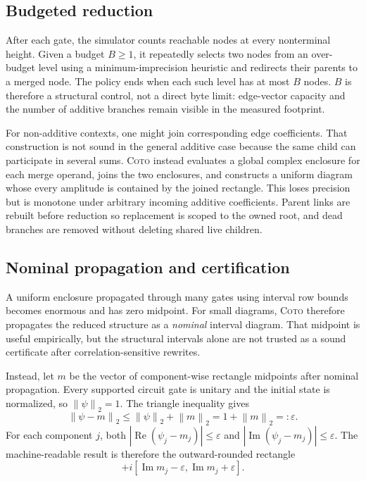\documentclass[sigconf,nonacm]{acmart}
\newcommand{\tool}{\textsc{Coto}}
\newcommand{\norm}[1]{\left\lVert #1\right\rVert}
\begin{document}
\subsection{Budgeted reduction}

After each gate, the simulator counts reachable nodes at every nonterminal height. Given a
budget $B\geq1$, it repeatedly selects two nodes from an over-budget level using a
minimum-imprecision heuristic and redirects their parents to a merged node. The policy ends
when each such level has at most $B$ nodes. $B$ is therefore a structural control, not a
direct byte limit: edge-vector capacity and the number of additive branches remain visible in
the measured footprint.

For non-additive contexts, one might join corresponding edge coefficients. That construction
is not sound in the general additive case because the same child can participate in several
sums. \tool{} instead evaluates a global complex enclosure for each merge operand, joins the
two enclosures, and constructs a uniform diagram whose every amplitude is contained by the
joined rectangle. This loses precision but is monotone under arbitrary incoming additive
coefficients. Parent links are rebuilt before reduction so replacement is scoped to the
owned root, and dead branches are removed without deleting shared live children.

\subsection{Nominal propagation and certification}

A uniform enclosure propagated through many gates using interval row bounds becomes enormous
and has zero midpoint. For small diagrams, \tool{} therefore propagates the reduced structure
as a \emph{nominal} interval diagram. That midpoint is useful empirically, but the structural
intervals alone are not trusted as a sound certificate after correlation-sensitive rewrites.

Instead, let $m$ be the vector of component-wise rectangle midpoints after nominal
propagation. Every supported circuit gate is unitary and the initial state is normalized, so
$\norm{\psi}_2=1$. The triangle inequality gives
\begin{equation}
  \norm{\psi-m}_2 \leq \norm{\psi}_2+\norm{m}_2=1+\norm{m}_2=:\varepsilon.
  \label{eq:certificate}
\end{equation}
For each component $j$, both
$|\operatorname{Re}(\psi_j-m_j)|\leq\varepsilon$ and
$|\operatorname{Im}(\psi_j-m_j)|\leq\varepsilon$. The machine-readable result is therefore
the outward-rounded rectangle
\begin{equation}
 [\operatorname{Re}m_j-\varepsilon,\operatorname{Re}m_j+\varepsilon]
 +i[\operatorname{Im}m_j-\varepsilon,\operatorname{Im}m_j+\varepsilon].
\end{equation}
\end{document}

